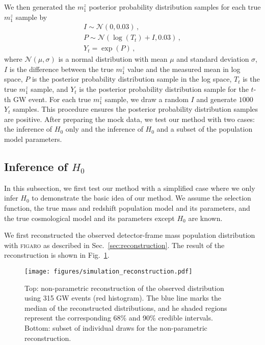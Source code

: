 \documentclass[sn-aps, pdflatex, iicol]{sn-jnl}
\begin{document}
We then generated the $m^z_1$ posterior probability distribution samples for each true $m^z_1$ sample by
\begin{gather*}
    I \sim \mathcal{N}(0, 0.03)\,,\\
    P \sim \mathcal{N}(\log(T_t)+I, 0.03)\,,\\
    Y_t = \exp(P)\,,
\end{gather*}
where $\mathcal{N}(\mu, \sigma)$ is a normal distribution with mean $\mu$ and standard deviation $\sigma$, $I$ is the difference between the true $m^z_1$ value and the measured mean in log space, $P$ is the posterior probability distribution sample in the log space, $T_t$ is the true $m^z_1$ sample, and $Y_t$ is the posterior probability distribution sample for the $t$-th \ac{GW} event.
For each true $m^z_1$ sample, we draw a random $I$ and generate $1000$ $Y_t$ samples.
This procedure ensures the posterior probability distribution samples are positive.
After preparing the mock data, we test our method with two cases: the inference of $H_0$ only and the inference of $H_0$ and a subset of the population model parameters.

\subsection{Inference of $H_0$}
\label{sec:inference_H0}

In this subsection, we first test our method with a simplified case where we only infer $H_0$ to demonstrate the basic idea of our method.
We assume the selection function, the true mass and redshift population model and its parameters, and the true cosmological model and its parameters except $H_0$ are known.

We first reconstructed the observed detector-frame mass population distribution with \textsc{figaro} as described in Sec.~\ref{sec:reconstruction}.
The result of the reconstruction is shown in Fig.~\ref{fig:simulation_reconstruction}.
\begin{figure}
    \texttt{[image: figures/simulation\_reconstruction.pdf]}
    \caption{
        Top: non-parametric reconstruction of the observed distribution using 315 GW events (red histogram). The blue line marks the median of the reconstructed distributions, and he shaded regions represent the corresponding 68\% and 90\% credible intervals.
        Bottom: subset of individual draws for the non-parametric reconstruction.
    }
    \label{fig:simulation_reconstruction}
\end{figure}
\end{document}
